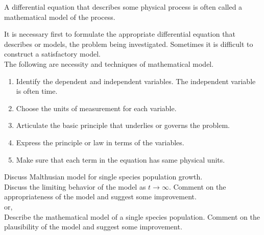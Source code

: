 \documentclass[../main-sheet.tex]{subfiles}
\begin{document}
\begin{soln}
    A differential equation that describes some physical process is often called a mathematical model of the process.

    It is necessary first to formulate the appropriate differential equation that describes or models, the problem being investigated. Sometimes it is difficult to construct a satisfactory model.\\

    The following are necessity and techniques of mathematical model.
    \begin{enumerate}[label=(\roman*)]
        \item Identify the dependent and independent variables. The independent variable is often time.
        \item Choose the units of measurement for each variable.
        \item Articulate the basic principle that underlies or governs the problem.
        \item Express the principle or law in terms of the variables.
        \item Make sure that each term in the equation has same physical units.
    \end{enumerate}
\end{soln}
\begin{prob}
    Discuss Malthusian model for single species population growth.\\
    Discuss the limiting behavior of the model as \(t\to \infty\). Comment on the appropriateness of the model and suggest some improvement.\\
    or,\\
    Describe the mathematical model of a single species population. Comment on the plausibility of the model and suggest some improvement.
\end{prob}
\end{document}
